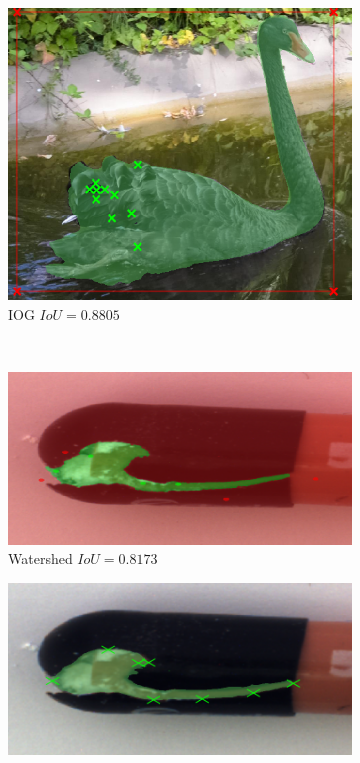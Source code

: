 \begin{figure}
\begin{subfigure}[t]{0.3\textwidth}
		\centering
		\includegraphics[width=\textwidth]{figures/appendix/method_predictions/swan34_iog.png}
		\caption{
			IOG $ IoU = 0.8805 $
		}
	\end{subfigure}
	\\
	\begin{subfigure}[t]{0.3\textwidth}
		\centering
		\includegraphics[width=\textwidth]{figures/appendix/method_predictions/pill78_watershed.png}
		\caption{
			Watershed $ IoU = 0.8173 $
		}
	\end{subfigure}
	\hfill
	\begin{subfigure}[t]{0.3\textwidth}
		\centering
		\includegraphics[width=\textwidth]{figures/appendix/method_predictions/pill78_dextr.png}

\end{subfigure}
\end{figure}
